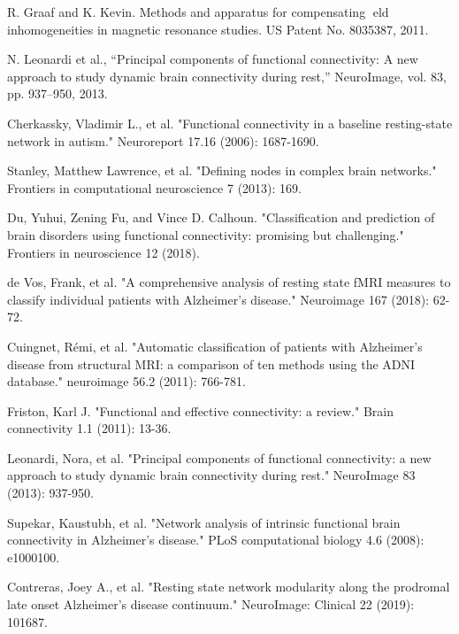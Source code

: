 \documentclass[preprint,12pt]{elsarticle}
\begin{document}
\begin{thebibliography}{1}
		R. Graaf and K. Kevin. Methods and apparatus for
		compensating eld inhomogeneities in magnetic resonance
		studies. US Patent No. 8035387, 2011.
		
			N. Leonardi et al., “Principal components of functional connectivity: A
		new approach to study dynamic brain connectivity during rest,” NeuroImage,
		vol. 83, pp. 937–950, 2013.
		
		Cherkassky, Vladimir L., et al. "Functional connectivity in a baseline resting-state network in autism." Neuroreport 17.16 (2006): 1687-1690.
		
		
		Stanley, Matthew Lawrence, et al. "Defining nodes in complex brain networks." Frontiers in computational neuroscience 7 (2013): 169.
		
		
		Du, Yuhui, Zening Fu, and Vince D. Calhoun. "Classification and prediction of brain disorders using functional connectivity: promising but challenging." Frontiers in neuroscience 12 (2018).
		
		de Vos, Frank, et al. "A comprehensive analysis of resting state fMRI measures to classify individual patients with Alzheimer's disease." Neuroimage 167 (2018): 62-72.
		
		
			Cuingnet, Rémi, et al. "Automatic classification of patients with Alzheimer's disease from structural MRI: a comparison of ten methods using the ADNI database." neuroimage 56.2 (2011): 766-781.
		
		
		Friston, Karl J. "Functional and effective connectivity: a review." Brain connectivity 1.1 (2011): 13-36.
		
		
		Leonardi, Nora, et al. "Principal components of functional connectivity: a new approach to study dynamic brain connectivity during rest." NeuroImage 83 (2013): 937-950.
		
		Supekar, Kaustubh, et al. "Network analysis of intrinsic functional brain connectivity in Alzheimer's disease." PLoS computational biology 4.6 (2008): e1000100.
		
		Contreras, Joey A., et al. "Resting state network modularity along the prodromal late onset Alzheimer's disease continuum." NeuroImage: Clinical 22 (2019): 101687.
		

\end{thebibliography}
\end{document}
